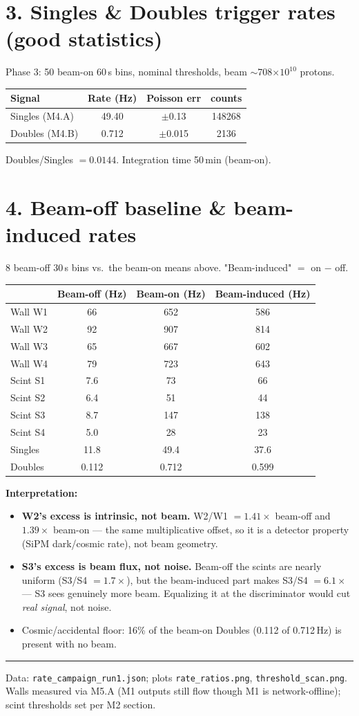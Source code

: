 \documentclass[11pt]{article}
\begin{document}
\section*{3. Singles \& Doubles trigger rates (good statistics)}
Phase 3: 50 beam-on 60\,s bins,
nominal thresholds, beam $\sim$708$\times10^{10}$ protons.
\begin{center}\begin{tabular}{l|ccc}
Signal & Rate (Hz) & Poisson err & counts \\ \hline
Singles (M4.A) & 49.40 & $\pm$0.13 & 148268 \\
Doubles (M4.B) & 0.712 & $\pm$0.015 & 2136 \\
\end{tabular}\end{center}
Doubles/Singles $= 0.0144$. Integration time 50\,min (beam-on).

\section*{4. Beam-off baseline \& beam-induced rates}
8 beam-off 30\,s bins vs.\ the beam-on means above. "Beam-induced" $=$ on $-$ off.
\begin{center}\begin{tabular}{l|ccc}
 & Beam-off (Hz) & Beam-on (Hz) & Beam-induced (Hz) \\ \hline
Wall W1 & 66 & 652 & 586 \\
Wall W2 & 92 & 907 & 814 \\
Wall W3 & 65 & 667 & 602 \\
Wall W4 & 79 & 723 & 643 \\ \hline
Scint S1 & 7.6 & 73 & 66 \\
Scint S2 & 6.4 & 51 & 44 \\
Scint S3 & 8.7 & 147 & 138 \\
Scint S4 & 5.0 & 28 & 23 \\ \hline
Singles & 11.8 & 49.4 & 37.6 \\
Doubles & 0.112 & 0.712 & 0.599 \\
\end{tabular}\end{center}
\textbf{Interpretation:}
\begin{itemize}\setlength{\itemsep}{1pt}
\item \textbf{W2's excess is intrinsic, not beam.} W2/W1 $= 1.41\times$ beam-off and
$1.39\times$ beam-on --- the same multiplicative offset, so it is a detector property
(SiPM dark/cosmic rate), not beam geometry.
\item \textbf{S3's excess is beam flux, not noise.} Beam-off the scints are nearly uniform
(S3/S4 $= 1.7\times$), but the beam-induced part makes S3/S4 $= 6.1\times$
--- S3 sees genuinely more beam. Equalizing it at the discriminator would cut \emph{real signal},
not noise.
\item Cosmic/accidental floor: 16\% of the beam-on Doubles (0.112 of 0.712\,Hz)
is present with no beam.
\end{itemize}

\vspace{1em}\hrule\vspace{0.4em}
{\small Data: \texttt{rate\_campaign\_run1.json}; plots \texttt{rate\_ratios.png},
\texttt{threshold\_scan.png}. Walls measured via M5.A (M1 outputs still flow though M1 is
network-offline); scint thresholds set per M2 section.}
\end{document}
